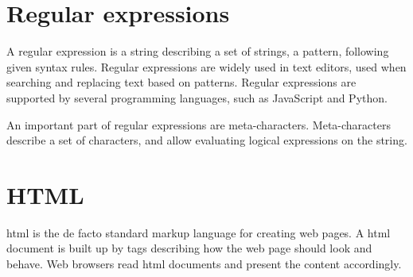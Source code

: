\section{Regular expressions}

A regular expression is a string describing a set of strings, a pattern, following given syntax rules. Regular expressions are widely used in text editors, used when searching and replacing text based on patterns. Regular expressions are supported by several programming languages, such as JavaScript and Python.

An important part of regular expressions are meta-characters. Meta-characters describe a set of characters, and allow evaluating logical expressions on the string.

\iffalse
        \^, \$                  & Start and end of string \\\hline
        .                       & Any character except newline \\\hline
        \textbackslash .        & Escaping of a meta-character (in this case \textit{.}) \\\hline
        \[abc\]                 & Group of characters (in this case, \textit{a}, \textit{b}, or \textit{c} \\\hline
        a\|b                    & Logical or of characters (in this case \textit{a} or \textit{b} \\\hline
        \textbackslash s, \textbackslash d, \textbackslash w           & Whitespace character, digit, and word character (\[a-zA-Z0-9\_\]) \\\hline
        \{m, n\}                & Between \textit{m} and \textit{n} inclusive occurrences of the previous meta-character \\\hline
        ?                       & Zero or one occurrences of the previous meta-character \\\hline
        +                       & One or more occurrences of the previous meta-character \\\hline
        *                       & Zero or more occurrences of the previous meta-character \\\hline
\fi



\section{HTML}

\gls{html} is the de facto standard markup language for creating web pages. A \gls{html} document is built up by tags describing how the web page should look and behave. Web browsers read \gls{html} documents and present the content accordingly.


